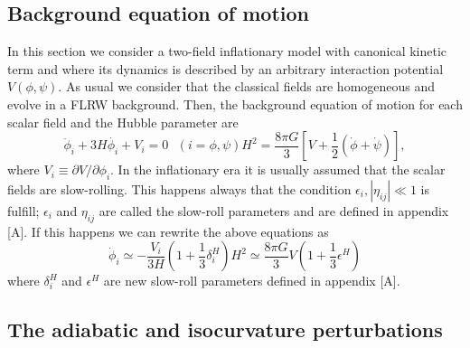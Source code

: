 \documentclass[a4paper,fleqn,usenatbib,useAMS]{mnras}
\begin{document}
\subsection{Background equation of motion}

In this section we consider a two-field inflationary model with canonical kinetic term and where its dynamics is described by an arbitrary interaction potential $V(\phi,\psi)$. As usual we consider that the classical fields are homogeneous and evolve in a FLRW background. Then, the background equation of motion for each scalar field and the Hubble parameter are
\begin{subequations}
\begin{equation}
\ddot{\phi}_i+3H\dot{\phi_i}+V_i=0 \ \ \ (i=\phi,\psi)
\end{equation}
\begin{equation}
H^2=\frac{8\pi G}{3}\left[V+\frac{1}{2}\left(\dot{\phi}+\dot\psi\right)\right],
\end{equation}
\end{subequations}
where $V_i\equiv\partial V/\partial \phi_i$. In the inflationary era it is usually assumed that the scalar fields are slow-rolling. This happens always that the condition $\epsilon_i,|\eta_{ij}|\ll 1$ is fulfill; $\epsilon_i$ and $\eta_{ij}$ are called the slow-roll parameters and are defined in appendix [A]. If this happens we can rewrite the above equations as
\begin{subequations}
\begin{equation}
\dot{\phi}_i\simeq -\frac{V_i}{3H}\left(1+\frac{1}{3}\delta_i^H\right)
\end{equation}
\begin{equation}
H^2\simeq \frac{8\pi G}{3}V\left(1+\frac{1}{3}\epsilon^H\right)
\end{equation}
\end{subequations}
where $\delta^H_i$ and $\epsilon^H$ are new slow-roll parameters defined in appendix [A]. 
\subsection{The adiabatic and isocurvature perturbations}
\end{document}

